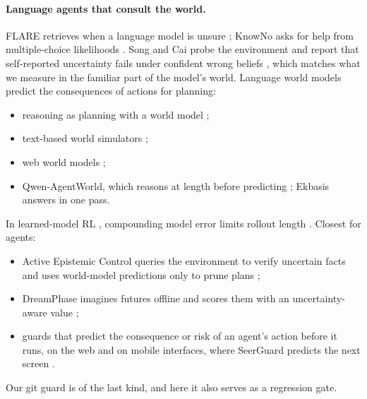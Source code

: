 \documentclass[11pt]{article}
\begin{document}
\paragraph{Language agents that consult the world.} FLARE retrieves when a language model is unsure \cite{flare2023};
KnowNo asks for help from multiple-choice likelihoods \cite{knowno2023}. Song and Cai probe the environment and report
that self-reported uncertainty fails under confident wrong beliefs \cite{songcai2026}, which matches what we measure in
the familiar part of the model's world. Language world models predict the consequences of actions for planning:
\begin{itemize}
  \item reasoning as planning with a world model \cite{hao2023};
  \item text-based world simulators \cite{wang2024sim};
  \item web world models \cite{gu2024webdreamer};
  \item Qwen-AgentWorld, which reasons at length before predicting \cite{qwenagentworld}; Ekbasis answers in one pass.
\end{itemize}
In learned-model RL \cite{ha2018,hafner2020,muzero2020}, compounding model error limits rollout length
\cite{talvitie2014,janner2019}. Closest for agents:
\begin{itemize}
  \item Active Epistemic Control queries the environment to verify uncertain facts and uses world-model predictions only
  to prune plans \cite{aec2026};
  \item DreamPhase imagines futures offline and scores them with an uncertainty-aware value \cite{dreamphase2026};
  \item guards that predict the consequence or risk of an agent's action before it runs, on the web \cite{webguard2025} and
  on mobile interfaces, where SeerGuard predicts the next screen \cite{seerguard2026}.
\end{itemize}
Our git guard is of the last kind, and here it also serves as a regression gate.
\end{document}
